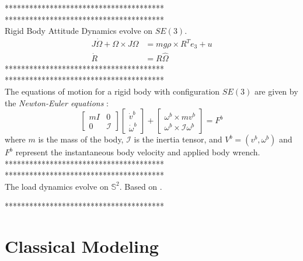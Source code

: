 ***************************************\\

***************************************\\
Rigid Body Attitude Dynamics evolve on $ SE(3) $.
\begin{align}\label{eq:eomrigidbody}
J\dot{\Omega}+\Omega\times J\Omega &= mg\rho\times R^Te_3+u\\ 
\dot{R} &= R\hat{\Omega}
\end{align}
***************************************\\


***************************************\\
The equations of motion for a rigid body with configuration $ SE(3) $ are given by the \textit{Newton-Euler equations} \cite{Murray1994}:
\begin{equation}\label{key}
\begin{bmatrix}
	mI&0\\
	0&\mathcal{I}
\end{bmatrix}
\begin{bmatrix}
	\dot{v}^b\\
	\dot{\omega}^b
\end{bmatrix}+
\begin{bmatrix}
	\omega^b\times mv^b\\
	\omega^b\times\mathcal{I}\omega^b
\end{bmatrix}=F^b
\end{equation}
where $ m $ is the mass of the body, $ \mathcal{I} $ is the inertia tensor, and $ V^b=(v^b,\omega^b) $ and $ F^b $ represent the instantaneous body velocity and applied body wrench.
***************************************\\


***************************************\\
The load dynamics evolve on $\mathbb{S}^2 $.
Based on \cite{Lee2011}.

***************************************\\


\section{Classical Modeling}\label{sec:mod.clas}

